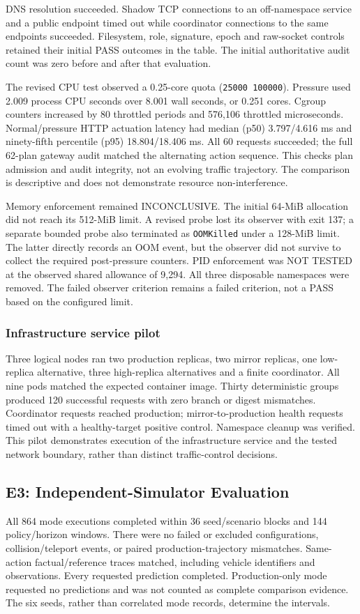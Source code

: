 \documentclass[conference,letterpaper]{IEEEtran}
\begin{document}
DNS resolution succeeded. Shadow TCP connections to an off-namespace service
and a public endpoint timed out while coordinator connections to the same
endpoints succeeded. Filesystem, role, signature, epoch and raw-socket controls
retained their initial PASS outcomes in the table. The initial authoritative
audit count was zero before and after that evaluation.

The revised CPU test observed a 0.25-core quota (\texttt{25000 100000}). Pressure used
2.009 process CPU seconds over 8.001 wall seconds, or 0.251 cores. Cgroup counters
increased by 80 throttled periods and 576,106 throttled microseconds.
Normal/pressure HTTP actuation latency had median (p50) 3.797/4.616 ms and
ninety-fifth percentile (p95) 18.804/18.406 ms. All 60 requests succeeded; the full 62-plan gateway audit
matched the alternating action sequence. This checks plan admission and audit
integrity, not an evolving traffic trajectory. The comparison is descriptive
and does not demonstrate resource non-interference.

Memory enforcement remained INCONCLUSIVE. The initial 64-MiB allocation did
not reach its 512-MiB limit. A revised probe lost its observer with exit 137;
a separate bounded probe also terminated as \texttt{OOMKilled} under a 128-MiB
limit. The latter directly records an OOM event, but the observer did not survive
to collect the required post-pressure counters. PID enforcement was NOT TESTED
at the observed shared allowance of 9,294. All three disposable namespaces were
removed. The failed observer criterion remains a failed criterion, not a PASS
based on the configured limit.

\subsubsection{Infrastructure service pilot}
Three logical nodes ran two production replicas, two mirror replicas, one
low-replica alternative, three high-replica alternatives and a finite coordinator.
All nine pods matched the expected container image. Thirty deterministic groups
produced 120 successful requests with zero branch or digest mismatches.
Coordinator requests reached production; mirror-to-production health requests
timed out with a healthy-target positive control. Namespace cleanup was verified.
This pilot demonstrates execution of the infrastructure service and the tested
network boundary, rather than distinct traffic-control decisions.

\subsection{E3: Independent-Simulator Evaluation}
\label{sec:sumo-results}
All 864 mode executions completed within 36 seed/scenario blocks and 144
policy/horizon windows. There were no failed or excluded configurations,
collision/teleport events, or paired production-trajectory mismatches.
Same-action factual/reference traces matched, including vehicle identifiers and
observations. Every requested prediction completed. Production-only mode
requested no predictions and was not counted as complete comparison evidence.
The six seeds, rather than correlated mode records, determine the intervals.
\end{document}
